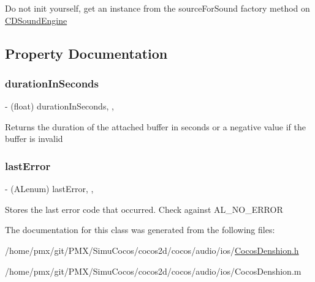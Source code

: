 Do not init yourself, get an instance from the source\+For\+Sound factory method on \hyperlink{interfaceCDSoundEngine}{C\+D\+Sound\+Engine} 

\subsection{Property Documentation}
\mbox{\label{interfaceCDSoundSource_a403933986316e6c2ecc5d7357cece956}} 
\subsubsection{\texorpdfstring{duration\+In\+Seconds}{durationInSeconds}}
{\footnotesize\ttfamily -\/ (float) duration\+In\+Seconds\hspace{0.3cm}{\ttfamily [read]}, {\ttfamily [atomic]}, {\ttfamily [assign]}}

Returns the duration of the attached buffer in seconds or a negative value if the buffer is invalid \mbox{\label{interfaceCDSoundSource_aca348013aabdd95a2bb6aa837c7f74e9}} 
\subsubsection{\texorpdfstring{last\+Error}{lastError}}
{\footnotesize\ttfamily -\/ (A\+Lenum) last\+Error\hspace{0.3cm}{\ttfamily [read]}, {\ttfamily [atomic]}, {\ttfamily [assign]}}

Stores the last error code that occurred. Check against A\+L\+\_\+\+N\+O\+\_\+\+E\+R\+R\+OR 

The documentation for this class was generated from the following files\+:\begin{DoxyCompactItemize}
\item 
/home/pmx/git/\+P\+M\+X/\+Simu\+Cocos/cocos2d/cocos/audio/ios/\hyperlink{cocos2d_2cocos_2audio_2ios_2CocosDenshion_8h}{Cocos\+Denshion.\+h}\item 
/home/pmx/git/\+P\+M\+X/\+Simu\+Cocos/cocos2d/cocos/audio/ios/Cocos\+Denshion.\+m\end{DoxyCompactItemize}
